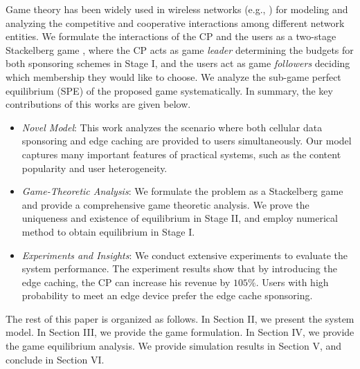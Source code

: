 Game theory \cite{gametheory} has been widely used in wireless networks (e.g., \cite{gao-1,gao-2,gao-3,gao-4,gao-5,gao-6}) for modeling and analyzing the competitive and cooperative interactions among different network entities.
We formulate the interactions of the CP and the users as a two-stage Stackelberg game \cite{gametheory}, where the CP acts as game \emph{leader} determining the budgets for both sponsoring schemes in Stage I, and the users act as game \emph{followers} deciding which membership they would like to choose. 
We analyze the sub-game perfect equilibrium (SPE) of the proposed game systematically.
In summary, the key contributions of this works are given below.
\begin{itemize}
\item \emph{Novel Model}:
    This work analyzes the scenario where both cellular data sponsoring and edge caching are provided to users simultaneously.
    Our model captures many important features of practical systems, such as the content popularity and user heterogeneity.

\item \emph{Game-Theoretic Analysis}:
    We formulate the problem as a Stackelberg game and provide a comprehensive game theoretic analysis.
    We prove the uniqueness and existence of equilibrium in Stage II, and employ numerical method to obtain equilibrium in Stage I.

\item \emph{Experiments and Insights}:
    We conduct extensive experiments to evaluate the system performance.
    The experiment results show that by introducing the edge caching, the CP can increase his revenue by $105\%$. Users with high probability to meet an edge device prefer the edge cache sponsoring. %
\end{itemize}

The rest of this paper is organized as follows.
In Section II, we present the system model.
In Section III, we provide the game formulation.
In Section IV, we provide the game equilibrium analysis.
We provide simulation results in Section V, and conclude in Section VI.

